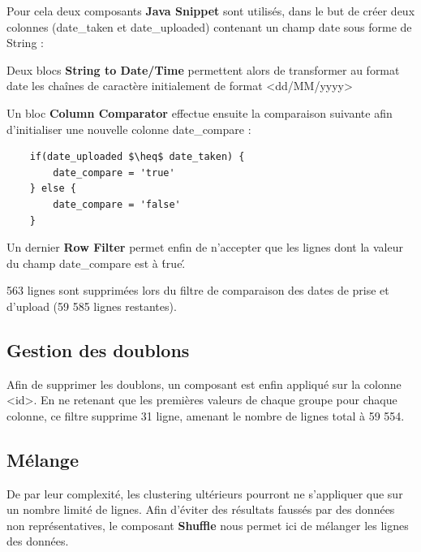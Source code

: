 Pour cela deux composants \textbf{Java Snippet} sont utilisés, dans le but de créer deux colonnes (date_taken et date_uploaded) contenant un champ date sous forme de String :

Deux blocs \textbf{String to Date/Time} permettent alors de transformer au format date les chaînes de caractère initialement de format <dd/MM/yyyy>

Un bloc \textbf{Column Comparator} effectue ensuite la comparaison suivante afin d'initialiser une nouvelle colonne date_compare :
\begin{lstlisting}
    if(date_uploaded $\heq$ date_taken) {
        date_compare = 'true'
    } else {
        date_compare = 'false'
    }
\end{lstlisting}

Un dernier \textbf{Row Filter} permet enfin de n'accepter que les lignes dont la valeur du champ date_compare est à \'true\'.

563 lignes sont supprimées lors du filtre de comparaison des dates de prise et d'upload (59 585 lignes restantes).\\

\subsection{Gestion des doublons}
Afin de supprimer les doublons, un composant  est enfin appliqué sur la colonne <id>. En ne retenant que les premières valeurs de chaque groupe pour chaque colonne, ce filtre supprime 31 ligne, amenant le nombre de lignes total à 59 554.

\subsection{Mélange}
De par leur complexité, les clustering ultérieurs pourront ne s'appliquer que sur un nombre limité de lignes. Afin d'éviter des résultats faussés par des données non représentatives, le composant \textbf{Shuffle} nous permet ici de mélanger les lignes des données.

